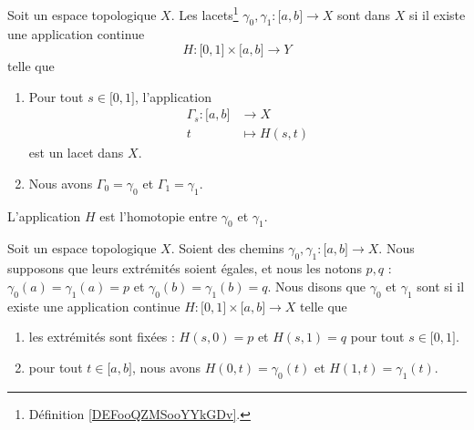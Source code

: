 \begin{definition}     \label{DEFooHJQTooYUFcee}
	Soit un espace topologique \( X\). Les lacets\footnote{Définition \ref{DEFooQZMSooYYkGDv}.} \( \gamma_0,\gamma_1\colon \mathopen[ a , b \mathclose]\to X\) sont  dans \( X\) si il existe une application continue
	\begin{equation}
		H\colon \mathopen[ 0 , 1 \mathclose]\times \mathopen[ a , b \mathclose]\to Y
	\end{equation}
	telle que
	\begin{enumerate}
		\item
		      Pour tout \( s\in\mathopen[ 0 , 1 \mathclose]\), l'application
		      \begin{equation}
			      \begin{aligned}
				      \Gamma_s\colon \mathopen[ a , b \mathclose] & \to X          \\
				      t                                           & \mapsto H(s,t)
			      \end{aligned}
		      \end{equation}
		      est un lacet dans \( X\).
		\item
		      Nous avons \( \Gamma_0=\gamma_0\) et \( \Gamma_1=\gamma_1\).
	\end{enumerate}
	L'application \( H\) est l'homotopie entre \( \gamma_0\) et \( \gamma_1\).
\end{definition}

\begin{definition}   \label{DEFooLXDTooDPgxqL}
	Soit un espace topologique \( X\). Soient des chemins \( \gamma_0,\gamma_1\colon \mathopen[ a , b \mathclose]\to X\). Nous supposons que leurs extrémités soient égales, et nous les notons \( p,q\) : \( \gamma_0(a)=\gamma_1(a)=p\) et \( \gamma_0(b)=\gamma_1(b)=q\). Nous disons que \( \gamma_0\) et \( \gamma_1\) sont  si il existe une application continue \( H\colon \mathopen[ 0 , 1 \mathclose]\times \mathopen[ a , b \mathclose]\to X\) telle que
	\begin{enumerate}
		\item
		      les extrémités sont fixées : \( H(s,0)=p\) et \( H(s,1)=q\) pour tout \( s\in \mathopen[ 0 , 1 \mathclose]\).
		\item
		      pour tout \( t\in\mathopen[ a , b \mathclose]\), nous avons \( H(0,t) =\gamma_0(t) \) et \( H(1,t)=\gamma_1(t)\).
	\end{enumerate}
\end{definition}

